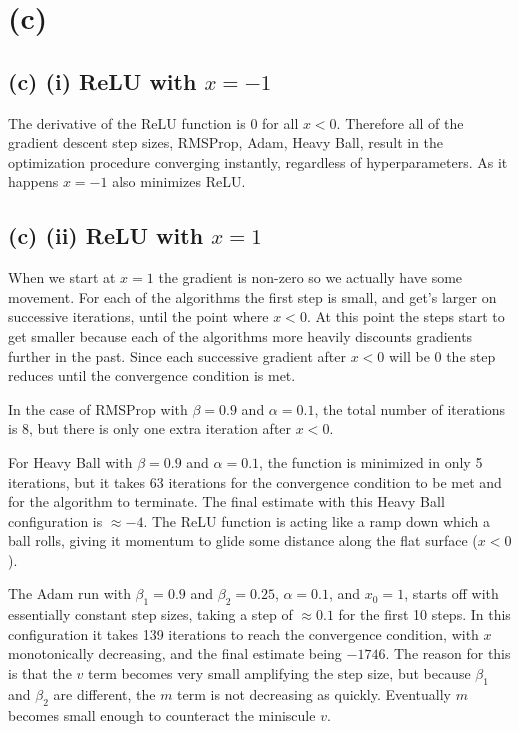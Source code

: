 \section{(c)}
\subsection{(c) (i) ReLU with $x=-1$}
The derivative of the ReLU function is $0$ for all $x<0$.
Therefore all of the gradient descent step sizes, RMSProp, Adam, Heavy Ball,
result in the optimization procedure converging instantly, regardless of hyperparameters.
As it happens $x=-1$ also minimizes ReLU.

\subsection{(c) (ii) ReLU with $x=1$}
When we start at $x=1$ the gradient is non-zero so we actually have some movement.
For each of the algorithms the first step is small, and get's larger on successive iterations,
until the point where $x<0$. At this point the steps start to get smaller because each
of the algorithms more heavily discounts gradients further in the past.
Since each successive gradient after $x<0$ will be $0$ the step reduces until
the convergence condition is met.

In the case of RMSProp with $\beta=0.9$ and $\alpha=0.1$, the total number of iterations is 8,
but there is only one extra iteration after $x<0$.

For Heavy Ball with $\beta=0.9$ and $\alpha=0.1$, the function is minimized in only 5 iterations,
but it takes 63 iterations for the convergence condition to be met and for the algorithm to terminate.
The final estimate with this Heavy Ball configuration is $\approx-4$.
The ReLU function is acting like a ramp down which a ball rolls, giving it momentum to
glide some distance along the flat surface ($x<0$).

The Adam run with $\beta_1=0.9$ and $\beta_2=0.25$, $\alpha=0.1$, and $x_0=1$, starts off
with essentially constant step sizes, taking a step of $\approx0.1$ for the first 10 steps.
In this configuration it takes 139 iterations to reach the convergence condition, with
$x$ monotonically decreasing, and the final estimate being $-1746$.
The reason for this is that the $v$ term becomes very small amplifying the step size,
but because $\beta_1$ and $\beta_2$ are different, the $m$ term is not decreasing
as quickly.
Eventually $m$ becomes small enough to counteract the miniscule $v$.

